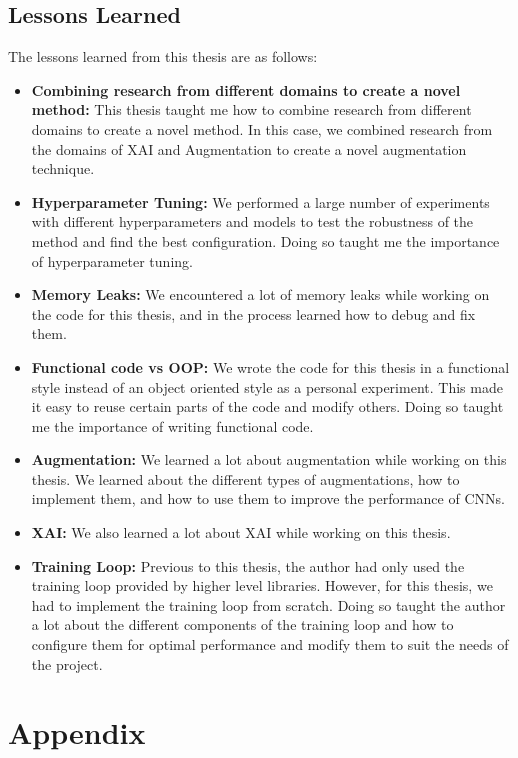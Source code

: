 \documentclass[a4paper,11pt,openright]{book}
\begin{document}
\section{Lessons Learned}
The lessons learned from this thesis are as follows:
\begin{itemize}
    \item \textbf{Combining research from different domains to create a novel method: } This thesis taught me how to combine research from different domains to create a novel method. In this case, we combined research from the domains of XAI and Augmentation to create a novel augmentation technique.
    \item \textbf{Hyperparameter Tuning: } We performed a large number of experiments with different hyperparameters and models to test the robustness of the method and find the best configuration. Doing so taught me the importance of hyperparameter tuning.
    \item \textbf{Memory Leaks: }We encountered a lot of memory leaks while working on the code for this thesis, and in the process learned how to debug and fix them. 
    \item \textbf{Functional code vs OOP: }We wrote the code for this thesis in a functional style instead of an object oriented style as a personal experiment. This made it easy to reuse certain parts of the code and modify others. Doing so taught me the importance of writing functional code.
    \item \textbf{Augmentation: }We learned a lot about augmentation while working on this thesis. We learned about the different types of augmentations, how to implement them, and how to use them to improve the performance of CNNs.
    \item \textbf{XAI: }We also learned a lot about XAI while working on this thesis. 
    \item \textbf{Training Loop: } Previous to this thesis, the author had only used the training loop provided by higher level libraries. However, for this thesis, we had to implement the training loop from scratch. Doing so taught the author a lot about the different components of the training loop and how to configure them for optimal performance and modify them to suit the needs of the project.
\end{itemize}




\chapter{Appendix} \label{ch:appendix}
\end{document}
